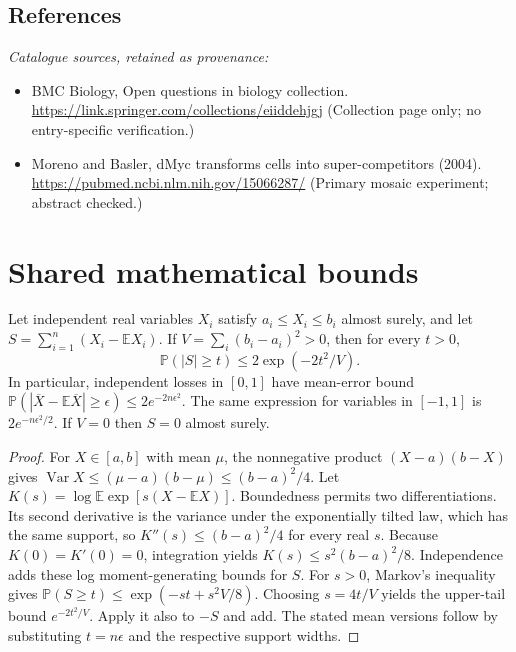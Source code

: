 \documentclass[11pt]{article}
\begin{document}
\subsection{References}
\noindent\emph{Catalogue sources, retained as provenance:}
\begin{itemize}
\item BMC Biology, Open questions in biology collection. \url{https://link.springer.com/collections/eiiddehjgj} (Collection page only; no entry-specific verification.)
\item Moreno and Basler, dMyc transforms cells into super-competitors (2004). \url{https://pubmed.ncbi.nlm.nih.gov/15066287/} (Primary mosaic experiment; abstract checked.)
\end{itemize}




\section{Shared mathematical bounds}\label{app:bounds}
\begin{lemma}\label{lem:bounded}
Let independent real variables $X_i$ satisfy $a_i\leq X_i\leq b_i$ almost surely,
and let $S=\sum_{i=1}^n(X_i-\mathbb{E} X_i)$. If
$V=\sum_i(b_i-a_i)^2>0$, then for every $t>0$,
\[
 \mathbb{P}(|S|\geq t)\leq 2\exp(-2t^2/V).
\]
In particular, independent losses in $[0,1]$ have mean-error bound
$\mathbb{P}(|\overline X-\mathbb{E}\overline X|\geq\epsilon)
\leq2e^{-2n\epsilon^2}$. The same expression for variables in $[-1,1]$
is $2e^{-n\epsilon^2/2}$. If $V=0$ then $S=0$ almost surely.
\end{lemma}
\begin{proof}
For $X\in[a,b]$ with mean $\mu$, the nonnegative product
$(X-a)(b-X)$ gives
$\operatorname{Var} X\leq(\mu-a)(b-\mu)\leq(b-a)^2/4$.
Let $K(s)=\log\mathbb{E}\exp[s(X-\mathbb{E} X)]$.
Boundedness permits two differentiations. Its second derivative is the variance
under the exponentially tilted law, which has the same support, so
$K''(s)\leq(b-a)^2/4$ for every real $s$.
Because $K(0)=K'(0)=0$, integration yields
$K(s)\leq s^2(b-a)^2/8$.
Independence adds these log moment-generating bounds for $S$.
For $s>0$, Markov's inequality gives
$\mathbb{P}(S\geq t)\leq\exp(-st+s^2V/8)$.
Choosing $s=4t/V$ yields the upper-tail bound $e^{-2t^2/V}$.
Apply it also to $-S$ and add. The stated mean versions follow by substituting
$t=n\epsilon$ and the respective support widths.
\end{proof}
\end{document}
